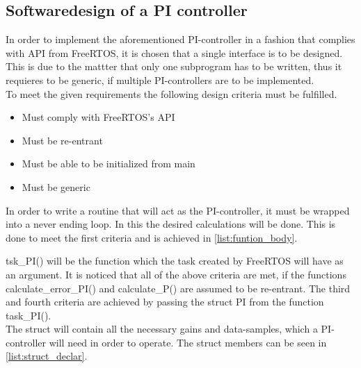 \documentclass[../../../main]{subfiles}
\begin{document}
\subsection{Softwaredesign of a PI controller}
In order to implement the aforementioned PI-controller in a fashion that complies with API from FreeRTOS, it is chosen that a single interface is to be designed. 
\\

This is due to the mattter that only one subprogram has to be written, thus it requieres to be generic, if multiple PI-controllers are to be implemented. 
\\

To meet the given requirements the following design criteria must be fulfilled.

\begin{itemize}

  \item Must comply with FreeRTOS's API
  \item Must be re-entrant
  \item Must be able to be initialized from main
  \item Must be generic
\end{itemize}

In order to write a routine that will act as the PI-controller, it must be wrapped into a never ending loop.
In this the desired calculations will be done. This is done to meet the first criteria and is achieved in \ref{list:funtion_body}.





tsk\_PI() will be the function which the task created by FreeRTOS will have as an argument.
It is noticed that all of the above criteria are met, if the functions calculate\_error\_PI() and calculate\_P() are assumed to be re-entrant.
The third and fourth criteria are achieved by passing the struct PI from the function task\_PI().
\\

The struct will contain all the necessary gains and data-samples, which a PI-controller will need in order to operate.
The struct members can be seen in \ref{list:struct_declar}. 

\end{document}
